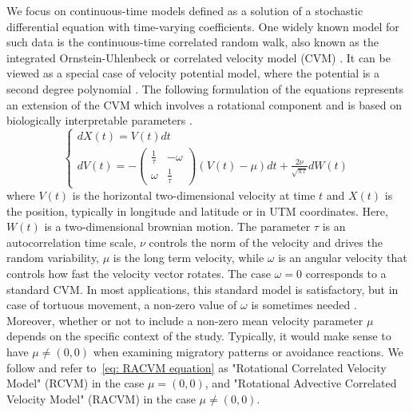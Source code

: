 \documentclass[11pt]{article}
\newcommand {\1}{\mathbb{1}}
\begin{document}
We focus on continuous-time models defined as a solution of a stochastic differential equation with time-varying coefficients. One widely known model for such data is the continuous-time correlated random walk, also known as the integrated Ornstein-Uhlenbeck or correlated velocity model (CVM) \cite{johnson_continuoustime_2008}. It can be viewed as a special case of velocity potential model, where the potential is a second degree polynomial \cite{preisler_analyzing_2013}. The following formulation of the equations represents an extension of the CVM which involves a rotational component and  is based on biologically interpretable parameters \cite{gurarie_correlated_2017}.
\begin{equation} \left\{
	\begin{array}{l}
		dX(t)=V(t)dt \\
		dV(t)=-\begin{pmatrix} 
			\frac{1}{\tau} & -\omega \\
			\omega & \frac{1}{\tau}
		\end{pmatrix}(V(t)-\mu)dt+\frac{2\nu}{\sqrt{\pi \tau}} dW(t) 
	\end{array}
	\right.
	\label{eq: RACVM equation}
\end{equation}
where $V(t)$ is the horizontal two-dimensional velocity at time $t$ and $X(t)$ is the position, typically in longitude and latitude or in UTM coordinates. Here, $W(t)$ is a two-dimensional brownian motion. 
The parameter $\tau$ is an autocorrelation time scale, $\nu$ controls the norm of the velocity and drives the random variability, $\mu$ is the long term velocity, while $\omega$ is an angular velocity that controls how fast the velocity vector rotates. The case $\omega=0$ corresponds to a standard CVM. In most applications, this standard model is satisfactory, but in case of tortuous movement, a non-zero value of $\omega$ is sometimes needed \cite{gurarie_correlated_2017,alt_correlation_1990,albertsen_generalizing_2018}. Moreover, whether or not to include a non-zero mean velocity parameter $\mu$ depends on the specific context of the study. Typically, it would make sense to have $\mu\neq (0,0)$ when examining migratory patterns or avoidance reactions. We follow \cite{gurarie_correlated_2017} and refer to~\ref{eq: RACVM equation} as "Rotational Correlated Velocity Model" (RCVM) in the case $\mu=(0,0)$, and "Rotational Advective Correlated Velocity Model" (RACVM) in the case $\mu \neq (0,0)$.\\
\end{document}
